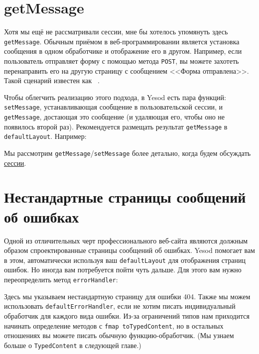 \section {getMessage}

Хотя мы ещё не рассматривали сессии, мне бы хотелось упомянуть здесь
\lstinline!getMessage!. Обычным приёмом в веб-программировании является
установка сообщения в одном обработчике и отображение его в другом. Например,
если пользователь отправляет форму с помощью метода \lstinline!POST!, вы можете
захотеть перенаправить его на другую страницу с сообщением <<Форма
отправлена>>. Такой сценарий известен как~%
.

Чтобы облегчить реализацию этого подхода, в Yesod есть пара функций:
\lstinline!setMessage!, устанавливающая сообщение в пользовательской сессии, и
\lstinline!getMessage!, достающая это сообщение (и удаляющая его, чтобы оно не
появилось второй раз). Рекомендуется размещать результат \lstinline!getMessage!
в \lstinline!defaultLayout!. Например:


Мы рассмотрим \lstinline!getMessage!/\lstinline!setMessage! более детально,
когда будем обсуждать \hyperref[chap:sessions]{сессии}.

\section {Нестандартные страницы сообщений об ошибках}

Одной из отличительных черт профессионального веб-сайта являются должным
образом спроектированные страницы сообщений об ошибках. Yesod помогает вам в
этом, автоматически используя ваш \lstinline!defaultLayout! для отображения
страниц ошибок. Но иногда вам потребуется пойти чуть дальше. Для этого вам
нужно переопределить метод \lstinline!errorHandler!:


Здесь мы указываем нестандартную страницу для ошибки 404. Также мы можем
использовать \lstinline!defaultErrorHandler!, если не хотим писать
индивидуальный обработчик для каждого вида ошибки. Из-за ограничений типов нам
приходится начинать определение методов с \lstinline!fmap toTypedContent!, но в
остальных отношениях вы можете писать обычную функцию-обработчик. (Мы узнаем
больше о \lstinline!TypedContent! в следующей главе.)

